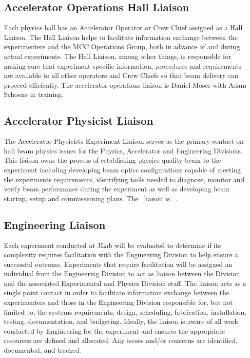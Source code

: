 \documentclass[10pt]{article}
\begin{document}
\subsection{Accelerator Operations Hall Liaison}

Each physics hall has an Accelerator Operator or Crew Chief assigned as a Hall Liaison. 
The Hall Liaison helps to facilitate information exchange between the
experimenters and the MCC Operations Group, both in advance of and during
actual experiments. The Hall Liaison, among other things, is responsible 
for making sure that experiment-specific information, procedures and requirements are available to all other operators and Crew Chiefs so that beam delivery can proceed efficiently. The accelerator operations liaison is Daniel Moser with Adam Schoene in training.
\subsection{Accelerator Physicist Liaison}

The Accelerator Physicists Experiment Liaison serves as the primary contact on hall beam physics issues 
for the Physics, Accelerator and Engineering Divisions. This liaison owns the process of establishing 
physics quality beam to the experiment including developing beam optics configurations capable of 
meeting the experiments requirements, identifying tools needed to diagnose, monitor and verify 
beam performance during the experiment as well as developing beam startup, setup and commissioning 
plans. The \HALL\ liaison is \AccPhysLiaison\ .


\subsection{Engineering Liaison}

Each experiment conducted at JLab will be evaluated to determine if its complexity requires facilitation 
with the Engineering Division to help ensure a successful outcome.  Experiments that require 
facilitation will be assigned an individual from the Engineering Division to act as liaison 
between the Division and the associated Experimental and Physics Division staff. The liaison 
acts as a single point contact in order to facilitate information exchange 
between the experimenters and those in the Engineering Division responsible for, 
but not limited to, the systems requirements, design, scheduling, fabrication, 
installation, testing, documentation, and budgeting. Ideally, the liaison 
is aware of all work conducted by Engineering for the experiment and ensures 
the appropriate resources are defined and allocated. Any issues and/or concerns are identified, 
documented, and tracked.
\end{document}
